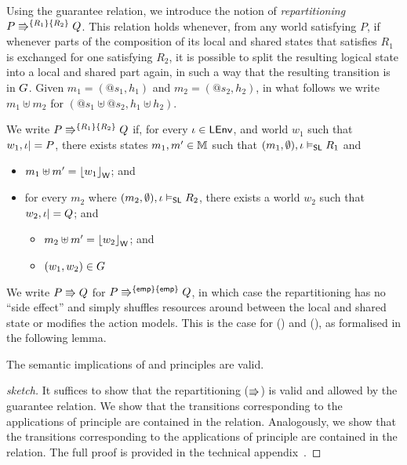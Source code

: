 Using the guarantee relation, we introduce the notion of \emph{repartitioning} $\repartitions{P}{Q}{R_1}{R_2}$. This relation holds whenever, from any world satisfying $P$, if whenever parts of the composition of its local and shared states that satisfies $R_1$ is exchanged for one satisfying $R_2$, it is possible to split the resulting logical state into a local and shared part again, in such a way that the resulting transition is in $\guarantee$. Given $m_1 = (@s_1, h_1)$ and $m_2 = (@s_2, h_2)$, in what follows we write $m_1 \uplus m_2$ for $(@s_1 \uplus @s_2, h_1 \uplus h_2)$.
%
%
\begin{definition}[Repartitioning] \label{def:repartitioning}
We write $\repartitions{P}{Q}{R_1}{R_2}$ if, for every $\lenv \in \LEnv$, and world $w_1$ such that $w_1, \lenv |= P$, there exists states $m_1, m' \in \Heaps$ such that $(m_1, \emptyset), \lenv \slsat R_1$ and
\begin{itemize} 
\item $m_1 \uplus m' = \reifyW{w_1}$; and
\item for every $m_2$ where $(m_2, \emptyset), \lenv \slsat R_2$,
  there exists a world $w_2$ such that $w_2, \lenv |= Q$; and
  \begin{itemize}
  	\item $m_2 \uplus m' = \reifyW{w_2}$; and
  	\item $(w_1, w_2) \in \guarantee$
  \end{itemize}
\end{itemize}
\end{definition}

We write $P \semimplies Q$ for $\repartitions{P}{Q}{\emp}{\emp} $, in which case the repartitioning has no ``side effect'' and simply shuffles resources around between the local and shared state or modifies the action models. This is the case for (\shiftRule) and (\extendRule), as formalised in the following lemma.
%
%
\begin{lemma}
The semantic implications of \extendRule and \shiftRule principles are valid. 
\begin{proof}[sketch]
It suffices to show that the repartitioning ($\semimplies$) is valid and allowed by the guarantee relation. We show that the transitions corresponding to the applications of \extendRule principle are contained in the \extendG relation. Analogously, we show that the transitions corresponding to the applications of \shiftRule principle are contained in the \shiftG relation. The full proof is provided in the technical appendix~\cite{colosl-tr14}.
\end{proof}
\end{lemma}
%
%

